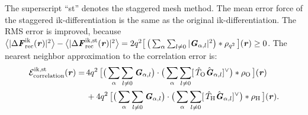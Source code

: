 \documentclass[aps,pre,preprint,unsortedaddress]{revtex4}
\renewcommand{\v}[1]{\textbf{\textit{#1}}}
\begin{document}
The superscript ``st'' denotes the staggered mesh method.
The mean error force of the staggered ik-differentiation is the
same as the original ik-differentiation.
The RMS error is improved, because
$\big\langle\vert\Delta\v F_{\textrm{rec}}^{\textrm{ik}}(\v r)\vert^2\big\rangle -
\big\langle\vert\Delta\v F_{\textrm{rec}}^{\textrm{ik,st}}(\v r)\vert^2\big\rangle=
2q^2
\big[\,
\big(
\sum_{\alpha} \sum_{l\neq 0}
\vert \v G_{\alpha,l}\vert^2
\big)
\ast \rho_{q^2}
\,\big] (\v r) \geq 0$.
The nearest neighbor approximation to the correlation error is:
\begin{align}\nonumber
  \mathcal E^{\textrm{ik,st}}_{\textrm{correlation}}(\v r)
  =\,&
  4q^2\,
  \big[
  \big(
  \sum_{\alpha} \sum_{l\neq 0}  
  \v G_{\alpha,l}
  \big)
  \cdot
  \big(
  \sum_{\alpha} \sum_{l\neq 0}  
  [\,\hat T_{\textrm{O}}\hat{\v G}_{\alpha,l}]^{\vee}
  \big)
  \ast \rho_{\textrm{O}}\,
  \big] (\v r) \\\nonumber
  \,&+
  4q^2\,
  \big[
  \big(
  \sum_{\alpha} \sum_{l\neq 0}  
  \v G_{\alpha,l}
  \big)
  \cdot
  \big(
  \sum_{\alpha} \sum_{l\neq 0}  
  [\,\hat T_{\textrm{H}}\hat{\v G}_{\alpha,l}]^{\vee}
  \big)
  \ast \rho_{\textrm{H}}\,
  \big] (\v r).
\end{align}
\end{document}
